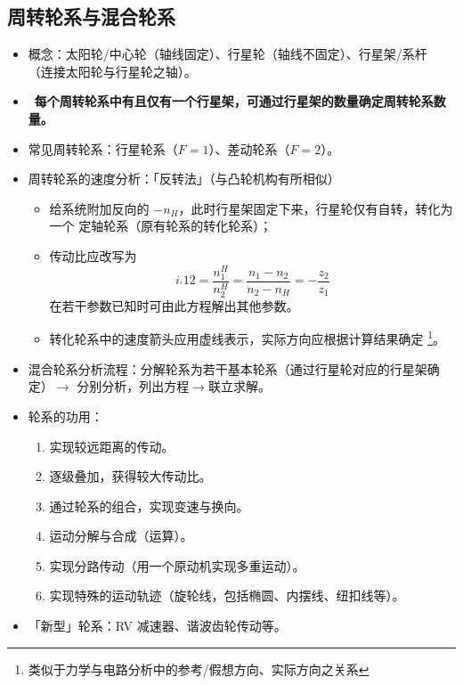 \documentclass[12pt,a4paper]{article}
\newcommand{\tightlist}{\setlength{\parskip}{0pt}\setlength{\itemsep}{0pt}}
\newcommand{\hint}[1]{\textsf{（#1）}}
\newcommand{\minor}[1]{{\color{gray} #1}}
\newcommand{\then}{$\to$}
\renewcommand{\emph}[1]{\faIcon[regular]{lightbulb}\ \textbf{#1}}
\begin{document}
\subsection{周转轮系与混合轮系}
\begin{itemize}\tightlist
    \item 概念：太阳轮/中心轮\hint{轴线固定}、行星轮\hint{轴线不固定}、行星架/系杆
    \hint{连接太阳轮与行星轮之轴}。
    \item \emph{每个周转轮系中有且仅有一个行星架，可通过行星架的数量确定周转轮系数量。}
    \item 常见周转轮系：行星轮系\hint{$F=1$}、差动轮系\hint{$F=2$}。
    \item 周转轮系的速度分析：「反转法」\hint{与凸轮机构有所相似}
    \begin{itemize}\tightlist
        \item 给系统附加反向的 $-n_H$，此时行星架固定下来，行星轮仅有自转，转化为一个
        定轴轮系\hint{原有轮系的转化轮系}；
        \item 传动比应改写为
        \begin{equation}
        i_'{12}=\frac{n_1^H}{n_2^H}=\frac{n_1-n_2}{n_2-n_H}=-\frac{z_2}{z_1}
        \end{equation}
        在若干参数已知时可由此方程解出其他参数。
        \item 转化轮系中的速度箭头应用虚线表示，实际方向应根据计算结果确定
        \footnote{类似于力学与电路分析中的参考/假想方向、实际方向之关系}。
    \end{itemize}
    \item 混合轮系分析流程：分解轮系为若干基本轮系\hint{通过行星轮对应的行星架确定}\then
    分别分析，列出方程\then 联立求解。
    \item 轮系的功用：
    \begin{enumerate}\tightlist
        \item 实现较远距离的传动。
        \item 逐级叠加，获得较大传动比。
        \item 通过轮系的组合，实现变速与换向。
        \item 运动分解与合成\hint{运算}。
        \item 实现分路传动\hint{用一个原动机实现多重运动}。
        \item 实现特殊的运动轨迹\hint{旋轮线，包括椭圆、内摆线、纽扣线等}。
    \end{enumerate}
    \item \minor{「新型」轮系：RV 减速器、谐波齿轮传动等。}
\end{itemize}
\end{document}
